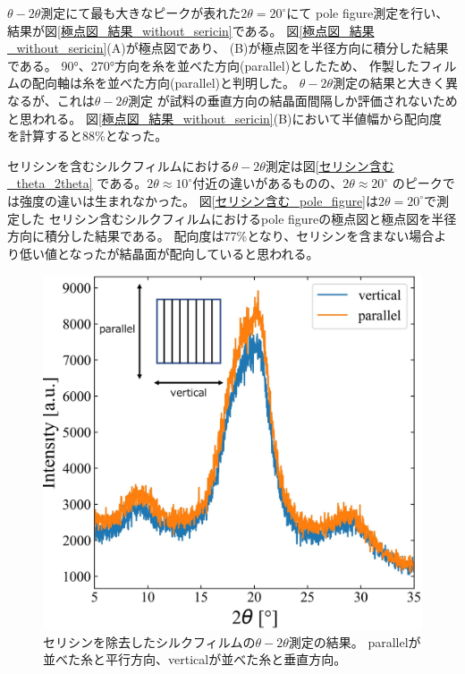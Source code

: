 \documentclass[dvipdfmx,12pt,a4paper]{jreport}
\begin{document}
			$\theta - 2\theta $測定にて最も大きなピークが表れた$2\theta=20^{\circ}$にて
			pole figure測定を行い、結果が図\ref{極点図_結果_without_sericin}である。
			図\ref{極点図_結果_without_sericin}(A)が極点図であり、
			(B)が極点図を半径方向に積分した結果である。
			90°、270°方向を糸を並べた方向(parallel)としたため、
			作製したフィルムの配向軸は糸を並べた方向(parallel)と判明した。
			$\theta-2\theta$測定の結果と大きく異なるが、これは$\theta-2\theta$測定
			が試料の垂直方向の結晶面間隔しか評価されないためと思われる。
			図\ref{極点図_結果_without_sericin}(B)において半値幅から配向度
			を計算すると88\%となった。

			セリシンを含むシルクフィルムにおける$\theta -2\theta$測定は図\ref{セリシン含む_theta_2theta}
			である。$2\theta \approx 10^{\circ}$付近の違いがあるものの、$2\theta \approx 20^{\circ}$
			のピークでは強度の違いは生まれなかった。
			図\ref{セリシン含む_pole_figure}は$2\theta = 20^{\circ}$で測定した
			セリシン含むシルクフィルムにおけるpole figureの極点図と極点図を半径方向に積分した結果である。
			配向度は77\%となり、セリシンを含まない場合より低い値となったが結晶面が配向していると思われる。
			\begin{figure}[H]
				\centering
				\includegraphics[scale=0.8]{theta_2theta_fibroin_film}
				\caption{セリシンを除去したシルクフィルムの$\theta - 2\theta$測定の結果。
				parallelが並べた糸と平行方向、verticalが並べた糸と垂直方向。}
				\label{theta_2theta_fibroin_film}
			\end{figure}
\end{document}

